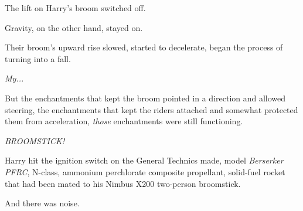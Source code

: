 The lift on Harry's broom switched off.

Gravity, on the other hand, stayed on.

Their broom's upward rise slowed, started to decelerate, began the process of turning into a fall.

\emph{My...}

But the enchantments that kept the broom pointed in a direction and allowed steering, the enchantments that kept the riders attached and somewhat protected them from acceleration, \emph{those} enchantments were still functioning.

\emph{BROOMSTICK!}

Harry hit the ignition switch on the General Technics made, model \emph{Berserker PFRC}, N-class, ammonium perchlorate composite propellant, solid-fuel rocket that had been mated to his Nimbus X200 two-person broomstick.

And there was noise.
